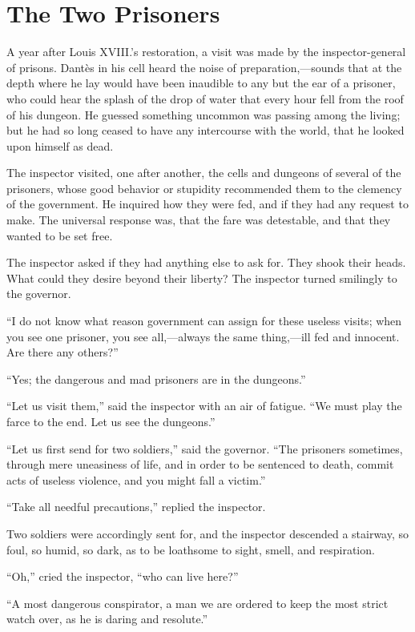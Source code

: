 \chapter{The Two Prisoners}

A year after Louis XVIII.’s restoration, a visit was made by the
inspector-general of prisons. Dantès in his cell heard the noise of
preparation,—sounds that at the depth where he lay would have been
inaudible to any but the ear of a prisoner, who could hear the splash
of the drop of water that every hour fell from the roof of his dungeon.
He guessed something uncommon was passing among the living; but he had
so long ceased to have any intercourse with the world, that he looked
upon himself as dead.

The inspector visited, one after another, the cells and dungeons of
several of the prisoners, whose good behavior or stupidity recommended
them to the clemency of the government. He inquired how they were fed,
and if they had any request to make. The universal response was, that
the fare was detestable, and that they wanted to be set free.

The inspector asked if they had anything else to ask for. They shook
their heads. What could they desire beyond their liberty? The inspector
turned smilingly to the governor.

“I do not know what reason government can assign for these useless
visits; when you see one prisoner, you see all,—always the same
thing,—ill fed and innocent. Are there any others?”

“Yes; the dangerous and mad prisoners are in the dungeons.”

“Let us visit them,” said the inspector with an air of fatigue. “We
must play the farce to the end. Let us see the dungeons.”

“Let us first send for two soldiers,” said the governor. “The prisoners
sometimes, through mere uneasiness of life, and in order to be
sentenced to death, commit acts of useless violence, and you might fall
a victim.”

“Take all needful precautions,” replied the inspector.

Two soldiers were accordingly sent for, and the inspector descended a
stairway, so foul, so humid, so dark, as to be loathsome to sight,
smell, and respiration.

“Oh,” cried the inspector, “who can live here?”

“A most dangerous conspirator, a man we are ordered to keep the most
strict watch over, as he is daring and resolute.”

